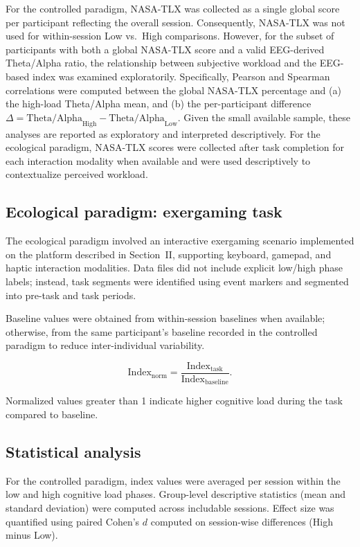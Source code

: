 \documentclass[conference]{IEEEtran}
\begin{document}
For the controlled paradigm, NASA-TLX was collected as a single global score per participant reflecting the overall session. Consequently, NASA-TLX was not used for within-session Low vs.\ High comparisons. However, for the subset of participants with both a global NASA-TLX score and a valid EEG-derived Theta/Alpha ratio, the relationship between subjective workload and the EEG-based index was examined exploratorily. Specifically, Pearson and Spearman correlations were computed between the global NASA-TLX percentage and (a) the high-load Theta/Alpha mean, and (b) the per-participant difference $\Delta = \mathrm{Theta/Alpha}_{\mathrm{High}} - \mathrm{Theta/Alpha}_{\mathrm{Low}}$. Given the small available sample, these analyses are reported as exploratory and interpreted descriptively. For the ecological paradigm, NASA-TLX scores were collected after task completion for each interaction modality when available and were used descriptively to contextualize perceived workload.

\subsection{Ecological paradigm: exergaming task}
The ecological paradigm involved an interactive exergaming scenario implemented on the platform described in Section~II, supporting keyboard, gamepad, and haptic interaction modalities. Data files did not include explicit low/high phase labels; instead, task segments were identified using event markers and segmented into pre-task and task periods.

Baseline values were obtained from within-session baselines when available; otherwise, from the same participant’s baseline recorded in the controlled paradigm to reduce inter-individual variability.

\begin{equation}
\mathrm{Index}_{\mathrm{norm}} = \frac{\mathrm{Index}_{\mathrm{task}}}{\mathrm{Index}_{\mathrm{baseline}}}.
\label{CLI}
\end{equation}

Normalized values greater than 1 indicate higher cognitive load during the task compared to baseline.

\subsection{Statistical analysis}
For the controlled paradigm, index values were averaged per session within the low and high cognitive load phases. Group-level descriptive statistics (mean and standard deviation) were computed across includable sessions. Effect size was quantified using paired Cohen’s $d$ computed on session-wise differences (High minus Low).
\end{document}
